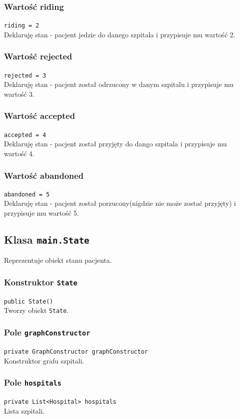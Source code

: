 \documentclass{article}
\begin{document}
\subsubsection{Wartość riding}
\texttt{riding = 2} \\
Deklaruję stan - pacjent jedzie do danego szpitala i przypisuje mu wartość 2.

\subsubsection{Wartość rejected}
\texttt{rejected = 3} \\
Deklaruję stan - pacjent został odrzucony w danym szpitalu i przypisuje mu wartość 3.

\subsubsection{Wartość accepted}
\texttt{accepted = 4} \\
Deklaruję stan - pacjent został przyjęty do dango szpitala i przypisuje mu wartość 4.

\subsubsection{Wartość abandoned}
\texttt{abandoned = 5} \\
Deklaruję stan - pacjent został porzucony(nigdzie nie może zostać przyjęty) i przypisuje mu wartość 5.

\pagebreak
\subsection{Klasa \texttt{main.State}}
Reprezentuje obiekt stanu pacjenta. \\

\subsubsection{Konstruktor \texttt{State}}
\texttt{public State()} \\
Tworzy obiekt \texttt{State}.

\subsubsection{Pole \texttt{graphConstructor}}
\texttt{private GraphConstructor graphConstructor} \\
Konstruktor grafu szpitali.

\subsubsection{Pole \texttt{hospitals}}
\texttt{private List<Hospital> hospitals} \\
Lista szpitali.
\end{document}
